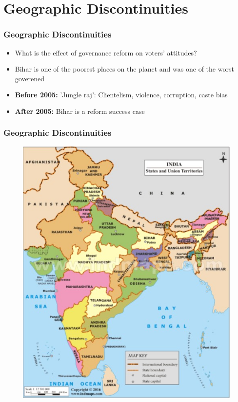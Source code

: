 \documentclass[xcolor=x11names,compress]{beamer}\usepackage[]{graphicx}\usepackage[]{color}
\renewcommand{\(}{\begin{columns}}
\renewcommand{\)}{\end{columns}}
\newcommand{\<}[1]{\begin{column}{#1}}
\renewcommand{\>}{\end{column}}
\begin{document}
\section{Geographic Discontinuities}

\begin{frame}
\frametitle{Geographic Discontinuities}
\begin{itemize}
\item What is the effect of governance reform on voters' attitudes?
\pause
\item Bihar is one of the poorest places on the planet and was one of the worst goverened
\pause
\item \textbf{Before 2005:} 'Jungle raj': Clientelism, violence, corruption, caste bias
\pause
\item \textbf{After 2005:} Bihar is a reform success case
\pause
\end{itemize}
\end{frame}

\begin{frame}
\frametitle{Geographic Discontinuities}
\begin{figure}
\includegraphics[scale=0.2]{figure/India_Map.jpg} 
\end{figure}
\end{frame}
\end{document}
